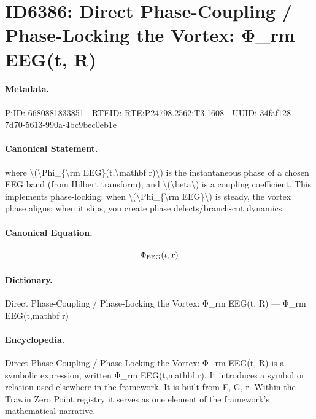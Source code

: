 \section*{ID6386: Direct Phase-Coupling / Phase-Locking the Vortex: Φ\_rm EEG(t, R)}
\paragraph{Metadata.}
PiID: 6680881833851 | RTEID: RTE:P24798.2562:T3.1608 | UUID: 34faf128-7d70-5613-990a-4bc9bec0eb1e

\paragraph{Canonical Statement.}
where \textbackslash{}(\textbackslash{}Phi\_\{\textbackslash{}rm EEG\}(t,\textbackslash{}mathbf r)\textbackslash{}) is the instantaneous phase of a chosen EEG band (from Hilbert transform), and \textbackslash{}(\textbackslash{}beta\textbackslash{}) is a coupling coefficient. This implements phase-locking: when \textbackslash{}(\textbackslash{}Phi\_\{\textbackslash{}rm EEG\}\textbackslash{}) is steady, the vortex phase aligns; when it slips, you create phase defects/branch-cut dynamics.

\paragraph{Canonical Equation.}
\[
\Phi_{\rm EEG}(t,\mathbf r)
\]

\paragraph{Dictionary.}
Direct Phase-Coupling / Phase-Locking the Vortex: Φ\_rm EEG(t, R) — Φ\_rm EEG(t,mathbf r)

\paragraph{Encyclopedia.}
Direct Phase-Coupling / Phase-Locking the Vortex: Φ\_rm EEG(t, R) is a symbolic expression, written Φ\_rm EEG(t,mathbf r). It introduces a symbol or relation used elsewhere in the framework. It is built from E, G, r. Within the Trawin Zero Point registry it serves as one element of the framework's mathematical narrative.
